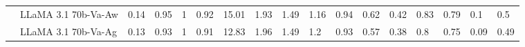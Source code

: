 \begin{table*}[t]
{\begin{tabular}{@{}ll|llll|llll|lll|ll|ll@{}}
                           & LLaMA 3.1 70b-Va-Aw  & 0.14                                                                    & 0.95                                                                     & 1                                                                     & 0.92                                                                  & 15.01                                                                   & 1.93                                                                  & 1.49                                                                  & 1.16                                                                   & 0.94                                                                    & 0.62                                                                  & 0.42                                                                   & 0.83                                                                   & 0.79                                                                   & 0.1                                                                      & 0.5                                                                      \\
                           & LLaMA 3.1 70b-Va-Ag  & 0.13                                                                    & 0.93                                                                     & 1                                                                     & 0.91                                                                  & 12.83                                                                   & 1.96                                                                  & 1.49                                                                  & 1.2                                                                    & 0.93                                                                    & 0.57                                                                  & 0.38                                                                   & 0.8                                                                    & 0.75                                                                   & 0.09                                                                     & 0.49                                                                     \\

\end{tabular}}
\end{table*}
